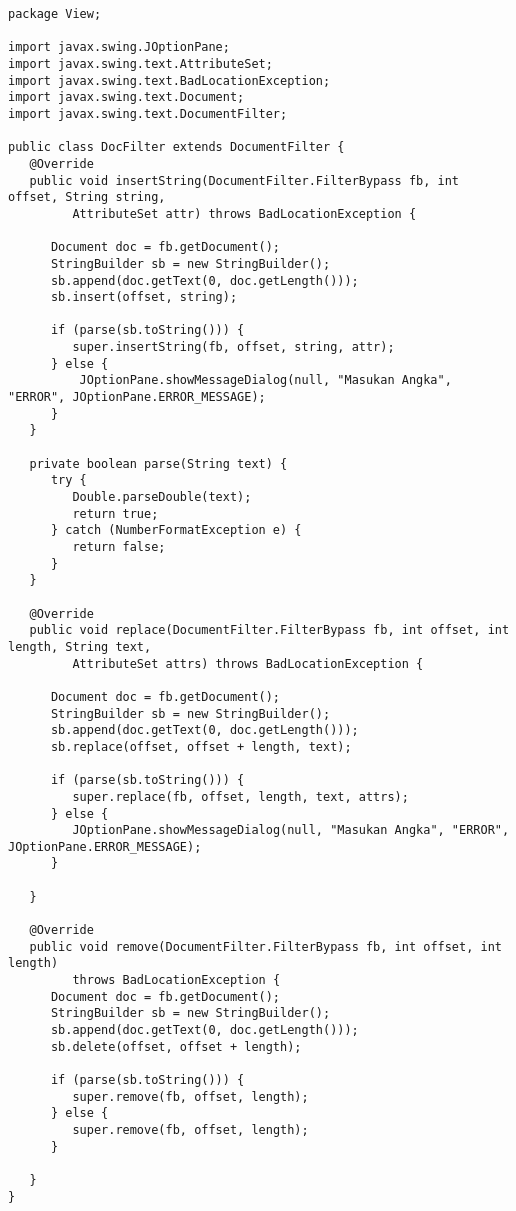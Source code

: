 \begin{lstlisting}[caption= DocFilter.java]
package View;

import javax.swing.JOptionPane;
import javax.swing.text.AttributeSet;
import javax.swing.text.BadLocationException;
import javax.swing.text.Document;
import javax.swing.text.DocumentFilter;

public class DocFilter extends DocumentFilter {
   @Override
   public void insertString(DocumentFilter.FilterBypass fb, int offset, String string,
         AttributeSet attr) throws BadLocationException {

      Document doc = fb.getDocument();
      StringBuilder sb = new StringBuilder();
      sb.append(doc.getText(0, doc.getLength()));
      sb.insert(offset, string);

      if (parse(sb.toString())) {
         super.insertString(fb, offset, string, attr);
      } else {
          JOptionPane.showMessageDialog(null, "Masukan Angka", "ERROR", JOptionPane.ERROR_MESSAGE);
      }
   }

   private boolean parse(String text) {
      try {
         Double.parseDouble(text);
         return true;
      } catch (NumberFormatException e) {
         return false;
      }
   }

   @Override
   public void replace(DocumentFilter.FilterBypass fb, int offset, int length, String text,
         AttributeSet attrs) throws BadLocationException {

      Document doc = fb.getDocument();
      StringBuilder sb = new StringBuilder();
      sb.append(doc.getText(0, doc.getLength()));
      sb.replace(offset, offset + length, text);

      if (parse(sb.toString())) {
         super.replace(fb, offset, length, text, attrs);
      } else {
         JOptionPane.showMessageDialog(null, "Masukan Angka", "ERROR", JOptionPane.ERROR_MESSAGE);
      }

   }

   @Override
   public void remove(DocumentFilter.FilterBypass fb, int offset, int length)
         throws BadLocationException {
      Document doc = fb.getDocument();
      StringBuilder sb = new StringBuilder();
      sb.append(doc.getText(0, doc.getLength()));
      sb.delete(offset, offset + length);

      if (parse(sb.toString())) {
         super.remove(fb, offset, length);
      } else {
         super.remove(fb, offset, length);
      }

   }
}
\end{lstlisting}
